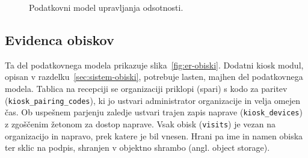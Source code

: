 \begin{figure}[htbp]
\centering
{}
\caption{Podatkovni model upravljanja odsotnosti.}
\label{fig:er-dopusti}
\end{figure}
\FloatBarrier

\subsection{Evidenca obiskov}
\label{sec:podatkovni-model-obiski}

Ta del podatkovnega modela prikazuje slika~\ref{fig:er-obiski}. Dodatni kiosk modul, opisan v razdelku~\ref{sec:sistem-obiski}, potrebuje lasten, majhen del podatkovnega modela. Tablica na recepciji se organizaciji priklopi (spari) s kodo za paritev (\texttt{kiosk\_pairing\_codes}), ki jo ustvari administrator organizacije in velja omejen čas. Ob uspešnem parjenju zaledje ustvari trajen zapis naprave (\texttt{kiosk\_devices}) z zgoščenim žetonom za dostop naprave. Vsak obisk (\texttt{visits}) je vezan na organizacijo in napravo, prek katere je bil vnesen. Hrani pa ime in namen obiska ter sklic na podpis, shranjen v objektno shrambo (angl. object storage).

